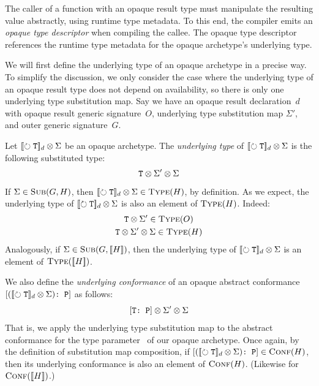 \documentclass[../generics]{subfiles}
\begin{document}
The caller of a function with an opaque result type must manipulate the resulting value abstractly, using runtime type metadata. To this end, the compiler emits an \emph{opaque type descriptor} when compiling the callee. The opaque type descriptor references the runtime type metadata for the opaque archetype's underlying type.

We will first define the underlying type of an opaque archetype in a precise way.
To simplify the discussion, we only consider the case where the underlying type of an opaque result type does not depend on availability, so there is only one underlying type substitution map. Say we have an opaque result declaration~$d$ with opaque result generic signature~$O$, underlying type substitution map $\Sigma'$, and outer generic signature~$G$.

\begin{definition}
Let $[\![\circlearrowright \texttt{\texttt{T}}]\!]_d \otimes \Sigma$ be an opaque archetype. The \emph{underlying type} of $[\![\circlearrowright \texttt{\texttt{T}}]\!]_d \otimes \Sigma$ is the following substituted type:
\[
\texttt{T} \otimes \Sigma' \otimes \Sigma
\]
If $\Sigma \in \textsc{Sub}({G, H})$, then $[\![\circlearrowright \texttt{\texttt{T}}]\!]_d \otimes \Sigma \in \textsc{Type}({H})$, by definition. As we expect, the underlying type of $[\![\circlearrowright \texttt{\texttt{T}}]\!]_d \otimes \Sigma$ is also an element of $\textsc{Type}({H})$. Indeed:
\begin{gather*}
\texttt{T} \otimes \Sigma' \in \textsc{Type}({O})\\
\texttt{T} \otimes \Sigma' \otimes \Sigma \in \textsc{Type}({H})
\end{gather*}
Analogously, if $\Sigma \in \textsc{Sub}({G, [\![H]\!]})$, then the underlying type of $[\![\circlearrowright \texttt{\texttt{T}}]\!]_d \otimes \Sigma$ is an element of $\textsc{Type}({[\![H]\!]})$.
\end{definition}

\begin{definition}
We also define the \emph{underlying conformance} of an opaque abstract conformance $[\texttt{$([\![\circlearrowright \texttt{\texttt{T}}]\!]_d \otimes \Sigma)$:~P}]$ as follows:
\[[\texttt{T:~P}] \otimes \Sigma' \otimes \Sigma\]
That is, we apply the underlying type substitution map to the abstract conformance for the type parameter \tT\ of our opaque archetype. Once again, by the definition of substitution map composition, if $[\texttt{$([\![\circlearrowright \texttt{\texttt{T}}]\!]_d \otimes \Sigma)$:~P}] \in \textsc{Conf}({H})$, then its underlying conformance is also an element of $\textsc{Conf}({H})$. (Likewise for $\textsc{Conf}({[\![H]\!]})$.)
\end{definition}
\end{document}
